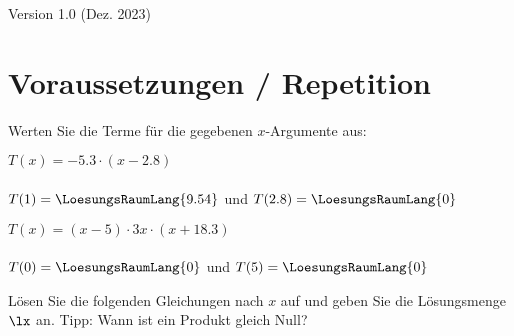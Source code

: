 

\renewcommand{\bbwAufgabenBlockID}{GL\_Br}




\usepackage{amssymb} %
\renewcommand{\metaHeaderLine}{Arbeitsblatt}
\renewcommand{\arbeitsblattTitel}{Bruchgleichungen}

\arbeitsblattHeader{}

\begin{center}Version 1.0 (Dez. 2023)\end{center}
\section{Voraussetzungen / Repetition}

Werten Sie die Terme für die gegebenen $x$-Argumente aus:

\begin{bbwAufgabenBlock}

\item $T(x) = -5.3\cdot{}(x-2.8)$  \\
\vspace{3mm}\\
$T(1)=\LoesungsRaumLang{9.54}$ 
und $T(2.8)=\LoesungsRaumLang{0}$



\item $T(x) = (x-5)\cdot{}3x\cdot{}(x+18.3)$  \\
\vspace{3mm}\\
$T(0)=\LoesungsRaumLang{0}$ 
und $T(5)=\LoesungsRaumLang{0}$

\end{bbwAufgabenBlock}

\noTRAINER{\newpage}

Lösen Sie die folgenden Gleichungen nach $x$ auf und geben Sie die
Lösungsmenge $\lx$ an. Tipp: Wann ist ein Produkt gleich Null?

